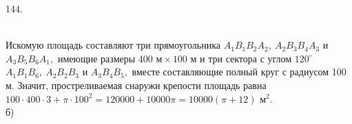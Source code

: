 \documentclass[12pt]{article}
\begin{document}
144. \begin{figure}[ht!]
\end{figure}\\
Искомую площадь составляют три прямоугольника $A_1B_1B_2A_2,\ A_2B_3B_4A_3$ и $A_3B_5B_6A_1,$ имеющие размеры $400\text{ м}\times100\text{ м}$ и три сектора с углом $120^\circ$ $A_1B_1B_6,\ A_2B_2B_3$ и $A_3B_4B_5,$ вместе составляющие полный круг с радиусом 100 м. Значит, простреливаемая снаружи крепости площадь равна $100\cdot400\cdot3+\pi\cdot100^2=120000+10000\pi=10000(\pi+12)\text{ м}^2.$\\
б) \begin{figure}[ht!]
\end{figure}\\
\end{document}
